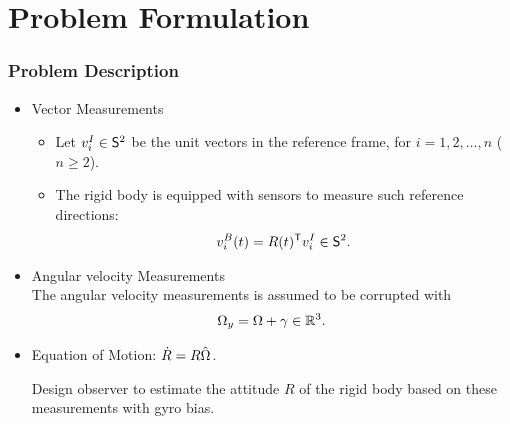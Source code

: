 
\section*{Problem Formulation}
\begin{frame} %
\frametitle{Problem Description}
\begin{itemize} 
\item Vector Measurements
	\begin{itemize} 
	\item Let $v_i^I\in\mathsf{S}^2$ be the unit vectors in the reference frame, for $i={1,2,\ldots,n}$ ($n\geq2$). 
	\vspace*{0.05cm}
	\item The rigid body is equipped with sensors to measure such reference directions: 
	{\small \begin{gather*} v_i^B(t)=R(t)^{\mathsf{T}} v_i^I\in\mathsf{S}^2. \end{gather*}} 
	\end{itemize}
\pause
\item Angular velocity Measurements\\
The angular velocity measurements is assumed to be corrupted with 
	{\small \begin{gather*} \Omega_y=\Omega+\gamma\in\mathbb{R}^3. \end{gather*}} 	
\item Equation of Motion: $\dot{R}=R\hat{\Omega}$. 
\pause
	\begin{tcolorbox}
	Design observer to estimate the attitude $R$ of the rigid body based on these measurements with gyro bias.
	\end{tcolorbox}
\end{itemize} 
\end{frame}   %

